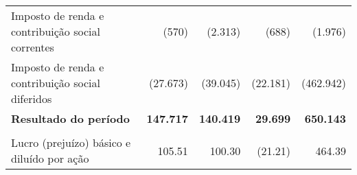 \documentclass[1pt,a4paper]{article}
\begin{document}
\begin{longtable}{p{6cm}r r r r }
			Imposto de renda e contribuição social correntes & (570) & (2.313) & (688) & (1.976)\\
			Imposto de renda e contribuição social diferidos & (27.673) & (39.045) & (22.181) & (462.942) \\
			\cmidrule(lr){2-3} \cmidrule(lr){4-5}
			\rowcolor{darkgray}\textbf{Resultado do período} & \textbf{147.717} & \textbf{140.419} & \textbf{29.699} & \textbf{650.143}\\
			\cmidrule(lr){2-3} \cmidrule(lr){4-5}\\
			Lucro (prejuízo) básico e diluído por ação & 105.51 & 100.30 & (21.21) & 464.39 \\
			\cmidrule(lr){2-3} \cmidrule(lr){4-5}
			
				
		\end{longtable}
\end{document}

